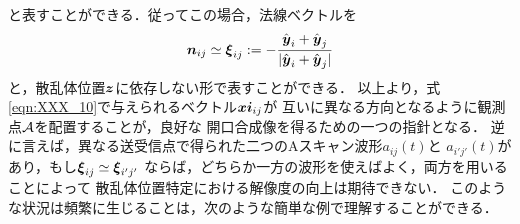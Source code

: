 と表すことができる．従ってこの場合，法線ベクトルを
\begin{equation}
	\mbox{\boldmath $n$}_{ij} \simeq  
	\mbox{\boldmath $\xi$}_{ij}:=
	-\frac{\hat{\mbox{\boldmath $y$}}_i+\hat{\mbox{\boldmath $y$}}_j}
	{| \hat{\mbox{\boldmath $y$}}_i+\hat{\mbox{\boldmath $y$}}_j|}
	\label{eqn:XXX_10}
\end{equation}
と，散乱体位置$\mbox{\boldmath $z$}$に依存しない形で表すことができる．
以上より，式\ref{eqn:XXX_10}で与えられるベクトル$\mbox{\boldmath $xi$}_{ij}$が
互いに異なる方向となるように観測点$\cal A$を配置することが，良好な
開口合成像を得るための一つの指針となる．
逆に言えば，異なる送受信点で得られた二つのAスキャン波形$a_{ij}(t)$と
$a_{i'j'}(t)$があり，もし$\mbox{\boldmath $\xi$}_{ij}\simeq \mbox{\boldmath $\xi$}_{i'j'}$
ならば，どちらか一方の波形を使えばよく，両方を用いることによって
散乱体位置特定における解像度の向上は期待できない．
このような状況は頻繁に生じることは，次のような簡単な例で理解することができる．
%

